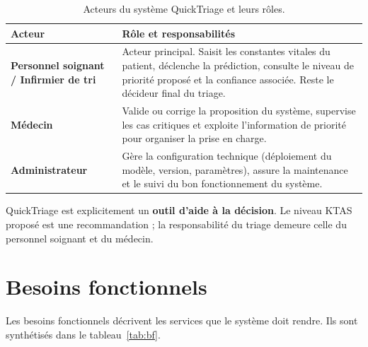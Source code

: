 \begin{table}[h]
\centering
\renewcommand{\arraystretch}{1.4}
\begin{tabular}{p{4cm} p{10cm}}
\toprule
\textbf{Acteur} & \textbf{Rôle et responsabilités} \\
\midrule
\textbf{Personnel soignant / Infirmier de tri} & Acteur principal. Saisit les constantes
vitales du patient, déclenche la prédiction, consulte le niveau de priorité proposé et la
confiance associée. Reste le décideur final du triage. \\
\textbf{Médecin} & Valide ou corrige la proposition du système, supervise les cas critiques
et exploite l'information de priorité pour organiser la prise en charge. \\
\textbf{Administrateur} & Gère la configuration technique (déploiement du modèle, version,
paramètres), assure la maintenance et le suivi du bon fonctionnement du système. \\
\bottomrule
\end{tabular}
\caption{Acteurs du système QuickTriage et leurs rôles.}
\label{tab:acteurs}
\end{table}

\begin{infobox}
QuickTriage est explicitement un \textbf{outil d'aide à la décision}. Le niveau KTAS proposé
est une recommandation ; la responsabilité du triage demeure celle du personnel soignant et
du médecin.
\end{infobox}

\section{Besoins fonctionnels}
Les besoins fonctionnels décrivent les services que le système doit rendre. Ils sont
synthétisés dans le tableau~\ref{tab:bf}.


